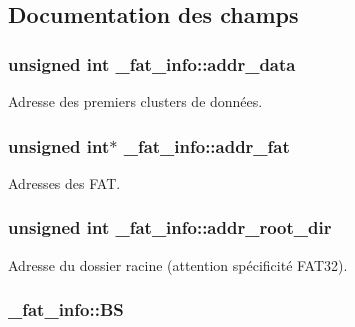 \subsection{Documentation des champs}
\hypertarget{struct__fat__info_a4cb2766e74dd65f24d4eb30ce3b49302}{
\subsubsection[{addr\+\_\+data}]{\setlength{\rightskip}{0pt plus 5cm}unsigned int \+\_\+fat\+\_\+info\+::addr\+\_\+data}}\label{struct__fat__info_a4cb2766e74dd65f24d4eb30ce3b49302}
Adresse des premiers clusters de données. \hypertarget{struct__fat__info_a0344193eb413dce4369b6e36ed03b92b}{
\subsubsection[{addr\+\_\+fat}]{\setlength{\rightskip}{0pt plus 5cm}unsigned int$\ast$ \+\_\+fat\+\_\+info\+::addr\+\_\+fat}}\label{struct__fat__info_a0344193eb413dce4369b6e36ed03b92b}
Adresses des F\+A\+T. \hypertarget{struct__fat__info_ae9133d320e0afc89c5e6cc9cedf6dfb5}{
\subsubsection[{addr\+\_\+root\+\_\+dir}]{\setlength{\rightskip}{0pt plus 5cm}unsigned int \+\_\+fat\+\_\+info\+::addr\+\_\+root\+\_\+dir}}\label{struct__fat__info_ae9133d320e0afc89c5e6cc9cedf6dfb5}
Adresse du dossier racine (attention spécificité F\+A\+T32). \hypertarget{struct__fat__info_adcd12930a4a7f94ecac42ba82567adb7}{
\subsubsection[{B\+S}]{ \+\_\+fat\+\_\+info\+::\+B\+S}}\label{struct__fat__info_adcd12930a4a7f94ecac42ba82567adb7}
